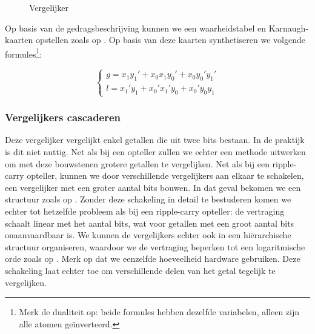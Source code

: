 \begin{figure}[hbt]
{
}
\caption{Vergelijker}
\end{figure}

Op basis van de gedragsbeschrijving kunnen we een waarheidstabel en Karnaugh-kaarten opstellen zoals op . Op basis van deze kaarten synthetiseren we volgende formules\footnote{Merk de dualiteit op: beide formules hebben dezelfde variabelen, alleen zijn alle atomen ge\"inverteerd.}:

\begin{equation}
\left\{\begin{array}{l}
g=x_1y_1'+x_0x_1y_0'+x_0y_0'y_1'\\
l=x_1'y_1+x_0'x_1'y_0+x_0'y_0y_1
\end{array}\right.
\end{equation}

\subsubsection{Vergelijkers cascaderen}
Deze vergelijker vergelijkt enkel getallen die uit twee bits bestaan. In de praktijk is dit niet nuttig. Net als bij een opteller zullen we echter een methode uitwerken om met deze bouwstenen grotere getallen te vergelijken. Net als bij een ripple-carry opteller, kunnen we door verschillende vergelijkers aan elkaar te schakelen, een vergelijker met een groter aantal bits bouwen. In dat geval bekomen we een structuur zoals op . Zonder deze schakeling in detail te bestuderen komen we echter tot hetzelfde probleem als bij een ripple-carry opteller: de vertraging schaalt linear met het aantal bits, wat voor getallen met een groot aantal bits onaanvaardbaar is. We kunnen de vergelijkers echter ook in een hi\"erarchische structuur organiseren, waardoor we de vertraging beperken tot een logaritmische orde zoals op . Merk op dat we eenzelfde hoeveelheid hardware gebruiken. Deze schakeling laat echter toe om verschillende delen van het getal tegelijk te vergelijken.


